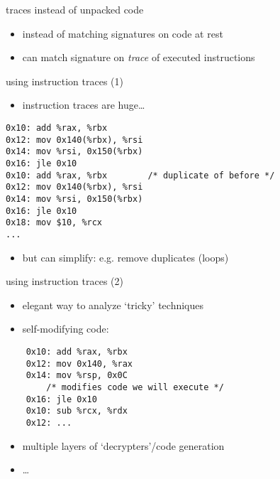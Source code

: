 \begin{frame}{traces instead of unpacked code}
    \begin{itemize}
    \item instead of matching signatures on code at rest
    \item can match signature on \textit{trace} of executed instructions
    \end{itemize}
\end{frame}

\begin{frame}[fragile,label=instrTraces1]{using instruction traces (1)}
\begin{itemize}
\item instruction traces are huge\ldots
\end{itemize}
\begin{lstlisting}
0x10: add %rax, %rbx
0x12: mov 0x140(%rbx), %rsi
0x14: mov %rsi, 0x150(%rbx)
0x16: jle 0x10
0x10: add %rax, %rbx        /* duplicate of before */
0x12: mov 0x140(%rbx), %rsi
0x14: mov %rsi, 0x150(%rbx)
0x16: jle 0x10
0x18: mov $10, %rcx
...
\end{lstlisting}
\begin{itemize}
\item but can simplify: e.g. remove duplicates (loops)
\end{itemize}
\end{frame}

\begin{frame}[fragile,label=instrTraces2]{using instruction traces (2)}
\begin{itemize}
\item elegant way to analyze `tricky' techniques
\item self-modifying code:
\end{itemize}
\begin{lstlisting}
    0x10: add %rax, %rbx
    0x12: mov 0x140, %rax
    0x14: mov %rsp, 0x0C
        /* modifies code we will execute */
    0x16: jle 0x10
    0x10: sub %rcx, %rdx
    0x12: ...
\end{lstlisting}
\begin{itemize}
\item multiple layers of `decrypters'/code generation
\item \ldots
\end{itemize}
\end{frame}

